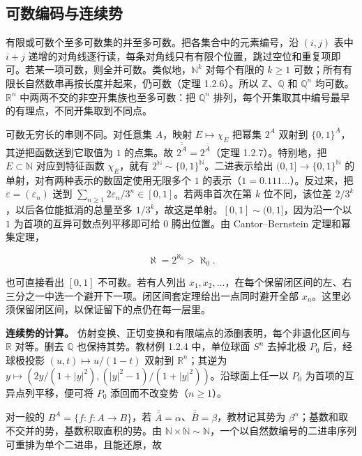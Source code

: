 \documentclass[11pt,a4paper]{article}
\begin{document}
\subsection{可数编码与连续势}

有限或可数个至多可数集的并至多可数。把各集合中的元素编号，沿 \((i,j)\) 表中 \(i+j\) 递增的对角线逐行读，每条对角线只有有限个位置，跳过空位和重复项即可。若某一项可数，则全并可数。类似地，\(\mathbb N^k\) 对每个有限的 \(k\ge1\) 可数；所有有限长自然数串再按长度并起来，仍可数（定理 1.2.6）。所以 \(\mathbb Z\)、\(\mathbb Q\) 和 \(\mathbb Q^n\) 均可数。\(\mathbb R^n\) 中两两不交的非空开集族也至多可数：把 \(\mathbb Q^n\) 排列，每个开集取其中编号最早的有理点，不同开集取到不同点。

可数无穷长的串则不同。对任意集 \(A\)，映射 \(E\mapsto\chi_E\) 把幂集 \(2^A\) 双射到 \(\{0,1\}^A\)，其逆把函数送到它取值为 \(1\) 的点集。故 \(\overline{\overline{2^A}}=2^{\overline{\overline A}}\)（定理 1.2.7）。特别地，把 \(E\subset\mathbb N\) 对应到特征函数 \(\chi_E\)，就有 \(2^{\mathbb N}\sim\{0,1\}^{\mathbb N}\)。二进表示给出 \((0,1]\to\{0,1\}^{\mathbb N}\) 的单射，对有两种表示的数固定使用无限多个 \(1\) 的表示（\(1=0.111\ldots\)）。反过来，把 \(\varepsilon=(\varepsilon_n)\) 送到 \(\sum_{n\ge1}2\varepsilon_n/3^n\in[0,1]\)。若两串首次在第 \(k\) 位不同，该位差 \(2/3^k\)，以后各位能抵消的总量至多 \(1/3^k\)，故这是单射。\([0,1]\sim(0,1]\)，因为沿一个以 \(1\) 为首项的互异可数点列平移即可给 \(0\) 腾出位置。由 Cantor--Bernstein 定理和幂集定理，

\[
\aleph=2^{\aleph_0}>\aleph_0 .
\]

也可直接看出 \([0,1]\) 不可数。若有人列出 \(x_1,x_2,\ldots\)，在每个保留闭区间的左、右三分之一中选一个避开下一项。闭区间套定理给出一点同时避开全部 \(x_n\)。这里必须保留闭区间，以保证留下的点仍在每一层里。

\textbf{连续势的计算。} 仿射变换、正切变换和有限端点的添删表明，每个非退化区间与 \(\mathbb R\) 对等。删去 \(\mathbb Q\) 也保持其势。教材例 1.2.4 中，单位球面 \(S^n\) 去掉北极 \(P_0\) 后，经球极投影 \((u,t)\mapsto u/(1-t)\) 双射到 \(\mathbb R^n\)；其逆为 \(y\mapsto(2y/(1+|y|^2),(|y|^2-1)/(1+|y|^2))\)。沿球面上任一以 \(P_0\) 为首项的互异点列平移，便可将 \(P_0\) 添回而不改变势（\(n\ge1\)）。

对一般的 \(B^A=\{f:f:A\to B\}\)，若 \(\overline{\overline A}=\alpha\)、\(\overline{\overline B}=\beta\)，教材记其势为 \(\beta^\alpha\)；基数和取不交并的势，基数积取直积的势。由 \(\mathbb N\times\mathbb N\sim\mathbb N\)，一个以自然数编号的二进串序列可重排为单个二进串，且能还原，故
\end{document}
